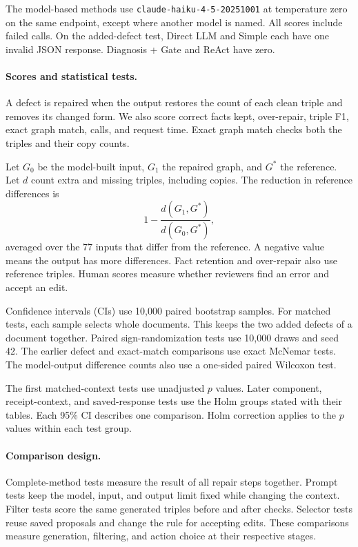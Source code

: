 The model-based methods use \texttt{claude-haiku-4-5-20251001}
\citep{ref_anthropic_claude45} at temperature zero on the same endpoint,
except where another model is named. All scores include failed calls.
On the added-defect test, Direct LLM and Simple each have one invalid JSON
response. Diagnosis + Gate and ReAct have zero.

\paragraph{Scores and statistical tests.}
A defect is repaired when the output restores the count of each clean triple
and removes its changed form. We also score correct facts kept, over-repair,
triple F1, exact graph match, calls, and request time. Exact graph match
checks both the triples and their copy counts.

Let $G_0$ be the model-built input, $G_1$ the repaired graph, and $G^*$
the reference. Let $d$ count extra and missing triples, including copies.
The reduction in reference differences is
\[
    1-\frac{d(G_1,G^*)}{d(G_0,G^*)},
\]
averaged over the 77 inputs that differ from the reference.
A negative value means the output has more differences. Fact retention
and over-repair also use reference triples. Human scores measure whether
reviewers find an error and accept an edit.

Confidence intervals (CIs) use 10,000 paired bootstrap samples.
For matched tests, each sample selects whole documents. This keeps the two
added defects of a document together. Paired sign-randomization tests use
10,000 draws and seed 42. The earlier defect and exact-match comparisons
use exact McNemar tests. The model-output difference counts also use a
one-sided paired Wilcoxon test.

The first matched-context tests use unadjusted $p$ values.
Later component, receipt-context, and saved-response tests use the Holm
groups stated with their tables. Each 95\% CI describes one comparison.
Holm correction applies to the $p$ values within each test group.

\paragraph{Comparison design.}
Complete-method tests measure the result of all repair steps together.
Prompt tests keep the model, input, and output limit fixed while changing
the context. Filter tests score the same generated triples before and
after checks. Selector tests reuse saved proposals and change the rule
for accepting edits. These comparisons measure generation, filtering,
and action choice at their respective stages.


